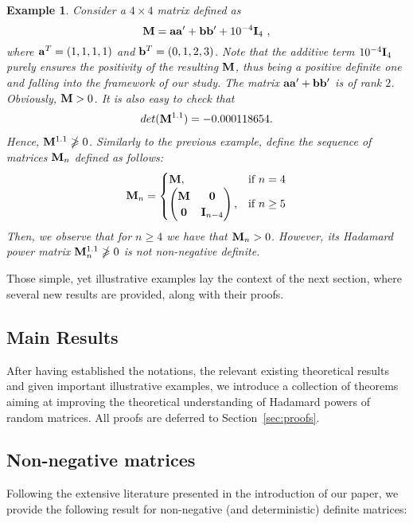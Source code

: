 \documentclass[conference,letterpaper]{IEEEtran}
\numberwithin{equation}{section}
\newcommand{\lbl}{\label}
\newcommand{\bd}{\bold}
\newcommand{\beaa}{\begin{eqnarray*}}
\newcommand{\eeaa}{\end{eqnarray*}}
\newtheorem{example}{{\sc Example}}[section]
\begin{document}
\medskip

\begin{example}\lbl{good_example} 
Consider a $4\times 4$ matrix defined as 
$$\bd{M}=\bd{a}\bd{a}'+\bd{b}\bd{b}' + 10^{-4}\bd{I}_4 \ ,$$ 
where $\bd{a}^T=(1,1,1,1)$ and $\bd{b}^T=(0,1,2,3)$. 
Note that the additive term $10^{-4}\bd{I}_4$ purely ensures the positivity of the resulting $\bd{M}$, thus being a positive definite one and falling into the framework of our study.
The matrix $\bd{a}\bd{a}'+\bd{b}\bd{b}'$  is of rank $2$. Obviously, $\bd{M}>0$. 
It is also easy to check that
\beaa
\mbox{det}(\bd{M}^{1.1})=-0.000118654.
\eeaa
Hence, $\bd{M}^{1.1}\ngeqslant 0$.
Similarly to the previous example, define the sequence of matrices $\bd{M}_n$ defined as follows:
\[
    \bd{M}_n= 
\begin{cases}
    \bd{M},& \text{if } n=4\\
    \begin{pmatrix}
\bd{M} & \bd{0}\\
\bd{0} & \bd{I}_{n-4}
\end{pmatrix},              & \text{if } n\geq 5
\end{cases}
\]
Then, we observe that for $n\geq 4$ we have that $\bd{M}_n>0$. 
However, its Hadamard power matrix $\bd{M}_n^{1.1}\ngeqslant 0$ is not non-negative definite.
\end{example}
\medskip
Those simple, yet illustrative examples lay the context of the next section, where several new results are provided, along with their proofs.

\subsection{Main Results}\lbl{Section_main}
After having established the notations, the relevant existing theoretical results and given important illustrative examples, we introduce a collection of theorems aiming at improving the theoretical understanding of Hadamard powers of random matrices.
All proofs are deferred to Section~\ref{sec:proofs}.

\subsection{Non-negative matrices}
Following the extensive literature presented in the introduction of our paper, we provide the following result for non-negative (and deterministic) definite matrices:
\end{document}
